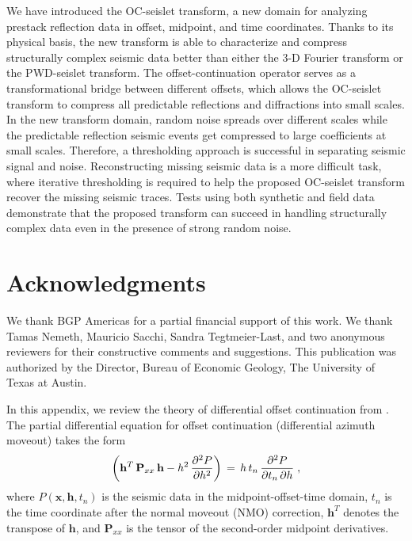 We have introduced the OC-seislet transform, a new domain for
 analyzing prestack reflection data in offset, midpoint, and time
 coordinates. Thanks to its physical basis, the new transform is
 able to characterize and compress structurally complex seismic data
 better than either the 3-D Fourier transform or the PWD-seislet
 transform. The offset-continuation operator serves as a
 transformational bridge between different offsets, which allows the
 OC-seislet transform to compress all predictable reflections and
 diffractions into small scales. In the new transform domain, random
 noise spreads over different scales while the predictable reflection
 seismic events get compressed to large coefficients at small
 scales. Therefore, a thresholding approach is successful in
 separating seismic signal and noise. Reconstructing missing seismic
 data is a more difficult task, where iterative thresholding is
 required to help the proposed OC-seislet transform recover the
 missing seismic traces. Tests using both synthetic and field data
 demonstrate that the proposed transform can succeed in handling
 structurally complex data even in the presence of strong random
 noise.

\section{Acknowledgments}
We thank BGP Americas for a partial financial support of this
work. We thank Tamas Nemeth, Mauricio Sacchi, Sandra
Tegtmeier-Last, and two anonymous reviewers for their constructive
comments and suggestions. This publication was authorized by the
Director, Bureau of Economic Geology, The University of Texas at
Austin.


In this appendix, we review the theory of differential offset
continuation from \cite{Fomel03b,GEO68-02-07180732}. The partial
differential equation for offset continuation (differential azimuth
moveout) takes the form
\begin{equation}
\left( \mathbf{h}^T\,\mathbf{P}_{xx}\,\mathbf{h} - 
  h^2\,{\partial^2 P \over \partial h^2} \right) \, = \, 
h\,t_n \, {\partial^2 P \over {\partial t_n \,
\partial h}} \;,
\label{eqn:OCequation3} 
\end{equation}
where $P(\mathbf{x},\mathbf{h},t_n)$ is the seismic data in the
midpoint-offset-time domain, $t_n$ is the time coordinate after the
normal moveout (NMO) correction, $\mathbf{h}^T$ denotes the transpose
of $\mathbf{h}$, and $\mathbf{P}_{xx}$ is the tensor of the
second-order midpoint derivatives.

